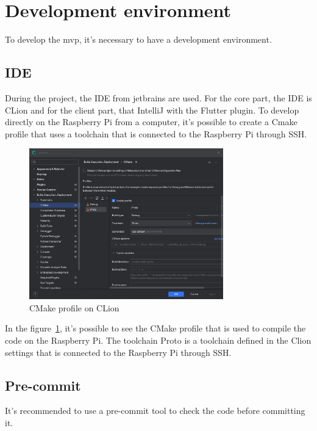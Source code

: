 \section{Development environment}
\label{sec:dev}
To develop the \acrshort{mvp}, it's necessary to have a development environment.

\subsection{IDE}
\label{subsec:ide}
During the project, the IDE from jetbrains are used.
For the core part, the IDE is CLion and for the client part, that IntelliJ with the Flutter plugin.
To develop directly on the Raspberry Pi from a computer, it's possible to create a Cmake profile that uses a toolchain that is connected to the Raspberry Pi through SSH.

\begin{figure}[ht]
  \centering
  \includegraphics[width=0.75\textwidth]{img/analyze_cmake-profile.png}
  \caption{CMake profile on CLion}
  \label{fig:analysis:dev:clion}
\end{figure}

In the figure~\ref{fig:analysis:dev:clion}, it's possible to see the CMake profile that is used to compile the code on the Raspberry Pi.
The toolchain Proto is a toolchain defined in the Clion settings that is connected to the Raspberry Pi through SSH.

\subsection{Pre-commit}
\label{subsec:pre-commit}

It's recommended to use a pre-commit tool to check the code before committing it.

